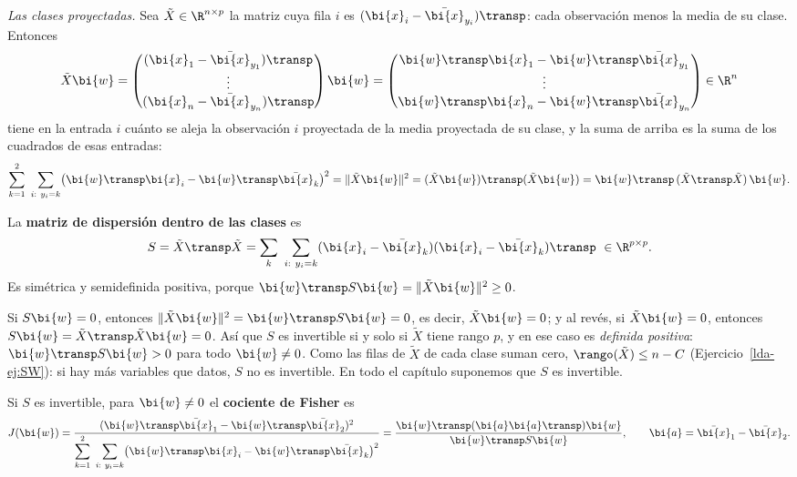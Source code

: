 \emph{Las clases proyectadas.} Sea $\tilde X\in\R^{n\times p}$ la matriz cuya fila
$i$ es $(\bi{x}_i-\bar{\bi{x}}_{y_i})\transp$: cada observación menos la media de su
clase. Entonces
\[
\tilde X\bi{w}=\begin{pmatrix}(\bi{x}_1-\bar{\bi{x}}_{y_1})\transp\\ \vdots\\ (\bi{x}_n-\bar{\bi{x}}_{y_n})\transp\end{pmatrix}\bi{w}
=\begin{pmatrix}\bi{w}\transp \bi{x}_1-\bi{w}\transp\bar{\bi{x}}_{y_1}\\ \vdots\\ \bi{w}\transp \bi{x}_n-\bi{w}\transp\bar{\bi{x}}_{y_n}\end{pmatrix}\in\R^n
\]
tiene en la entrada $i$ cuánto se aleja la observación $i$ proyectada de la
media proyectada de su clase, y la suma de arriba es la suma de los cuadrados
de esas entradas:
\[
\sum_{k=1}^{2}\ \sum_{i:\ y_i=k}\bigl(\bi{w}\transp \bi{x}_i-\bi{w}\transp\bar{\bi{x}}_k\bigr)^2
=\|\tilde X\bi{w}\|^2=(\tilde X\bi{w})\transp(\tilde X\bi{w})=\bi{w}\transp\,(\tilde X\transp \tilde X)\,\bi{w} .
\]

\begin{definition}\label{lda-def:SW}
La \textbf{matriz de dispersión dentro de las clases} es
\[
S=\tilde X\transp \tilde X=\sum_{k}\ \sum_{i:\ y_i=k}(\bi{x}_i-\bar{\bi{x}}_k)(\bi{x}_i-\bar{\bi{x}}_k)\transp\ \in\R^{p\times p}.
\]
Es simétrica y semidefinida positiva, porque $\bi{w}\transp S\bi{w}=\|\tilde X\bi{w}\|^2\ge0$.
\end{definition}

\begin{remark}\label{lda-rem:invertible}
Si $S\bi{w}=0$, entonces $\|\tilde X\bi{w}\|^2=\bi{w}\transp S\bi{w}=0$, es decir, $\tilde X\bi{w}=0$; y al
revés, si $\tilde X\bi{w}=0$, entonces $S\bi{w}=\tilde X\transp \tilde X\bi{w}=0$. Así que $S$ es
invertible si y solo si $\tilde X$ tiene rango $p$, y en ese caso es
\emph{definida positiva}: $\bi{w}\transp S\bi{w}>0$ para todo $\bi{w}\ne0$. Como las filas
de $\tilde X$ de cada clase suman cero, $\rango(\tilde X)\le n-C$
(Ejercicio~\ref{lda-ej:SW}): si hay más variables que datos, $S$ no es
invertible. En todo el capítulo suponemos que $S$ es invertible.
\end{remark}

\begin{definition}\label{lda-def:fisher}
Si $S$ es invertible, para $\bi{w}\ne0$ el \textbf{cociente de Fisher} es
\[
J(\bi{w})=\frac{(\bi{w}\transp\bar{\bi{x}}_1-\bi{w}\transp\bar{\bi{x}}_2)^2}{\displaystyle\sum_{k=1}^{2}\ \sum_{i:\ y_i=k}\bigl(\bi{w}\transp \bi{x}_i-\bi{w}\transp\bar{\bi{x}}_k\bigr)^2}
=\frac{\bi{w}\transp(\bi{a}\bi{a}\transp)\bi{w}}{\bi{w}\transp S\bi{w}},\qquad \bi{a}=\bar{\bi{x}}_1-\bar{\bi{x}}_2 .
\]
\end{definition}

